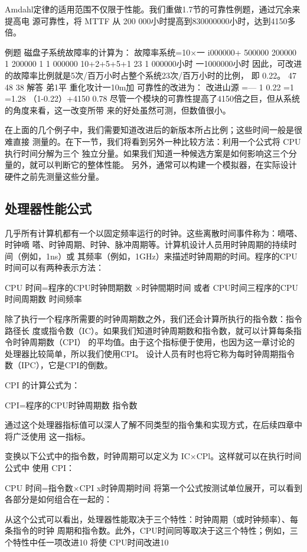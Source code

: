 Amdahl定律的适用范围不仅限于性能。我们重做1.7节的可靠性例题，通过冗余来提高电
源可靠性，将 MTTF 从 200 000小时提高到830000000小时，达到4150多倍。

例题
磁盘子系统故障率的计算为：
故障率系统=10×一
i000000+
500000 200000
1
200000
1
1 000000
10+2+5+5+1
23
1 000000小时
一1000000小时
因此，可改进的故障率比例就是5次/百万小时占整个系统23次/百万小时的比例，
即 0.22。
47
48
38
解答
弟1平 重化攻计一10m加
可靠性的改进为：
改进山源 =—
1
0.22
=1
=1.28
（1-0.22）+4150
0.78
尽管一个模块的可靠性提高了4150倍之巨，但从系统的角度来看，这一改变所带
来的好处虽然可测，但数值很小。

在上面的几个例子中，我们需要知道改进后的新版本所占比例；这些时间一般是很难直接
测量的。在下一节，我们将看到另外一种比较方法：利用一个公式将 CPU执行时间分解为三个
独立分量。如果我们知道一种候选方案是如何影响这三个分量的，就可以判断它的整体性能。
另外，通常可以构建一个模拟器，在实际设计硬件之前先测量这些分量。

\subsection{处理器性能公式}
几乎所有计算机都有一个以固定频率运行的时钟。这些离散时间事件称为：嘀嗒、时钟嘀
嗒、时钟周期、时钟、脉冲周期等。计算机设计人员用时钟周期的持续时间（例如，1ns）或
其频率（例如，1GHz）来描述时钟周期的时间。程序的CPU时间可以有两种表示方法：

CPU 时间=程序的CPU时钟問期数 ×时钟間期时间
或者
CPU时间三程序的CPU时间周期数
时间频率

除了执行一个程序所需要的时钟周期数之外，我们还会计算所执行的指令数：指令路径长
度或指令数（IC）。如果我们知道时钟周期数和指令数，就可以计算每条指令时钟周期数（CPI）
的平均值。由于这个指标便于使用，也因为这一章讨论的处理器比较简单，所以我们使用CPI。
设计人员有时也将它称为每时钟周期指令数（IPC），它是CPI的倒数。

CPI 的计算公式为：

CPI=程序的CPU时钟周期数
指令数

通过这个处理器指标值可以深人了解不同类型的指令集和实现方式，在后续四章中将广泛使用
这一指标。

变换以下公式中的指令数，时钟周期可以定义为 IC×CPl。这样就可以在执行时间公式中
使用 CPI：

CPU 时间=指令数×CPI x时钟周期时间
将第一个公式按测试单位展开，可以看到各部分是如何组合在一起的：

从这个公式可以看出，处理器性能取决于三个特性：时钟周期（或时钟频率）、每条指令的时钟
周期和指令数。此外，CPU时间同等取决于这三个特性；例如，三个特性中任一项改进10%
将使 CPU时间改进10%

